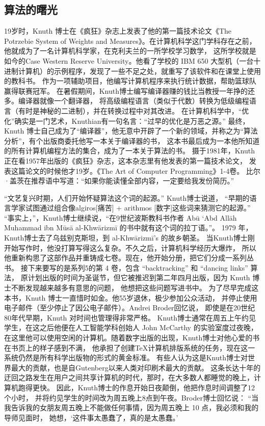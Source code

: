 \documentclass[12pt]{ctexart}
\begin{document}
\begin{multicols}{2}
\section{算法的曙光}

19岁时，Knuth 博士在《疯狂》杂志上发表了他的第一篇技术论文《The Potrzebie System of Weights and
Measures》。在计算机科学这门学科存在之前，他就成为了一名计算机科学家，在克利夫兰的一所学校学习数学，
这所学校就是如今的Case Western Reserve University。他看了学校的 IBM 650
大型机（一台十进制计算机）的示例程序，发现了一些不足之处，就重写了该软件和在课堂上使用的教科书。
作为一项辅助项目，他编写计算机程序来执行统计数据，帮助篮球队赢得联赛冠军。
在暑假期间，Knuth博士编写编译器赚的钱比当教授一年挣的还多。编译器就像一个翻译器，
将高级编程语言（类似于代数）转换为低级编程语言（有时是神秘的二进制），并在转换过程中对其改进。
在计算机科学中，“优化”确实是一门艺术，Knuthian有一句名言：“过早的优化是万恶之源。” 最终，Knuth
博士自己成为了“编译器”，他无意中开辟了一个新的领域，并称之为“算法分析”，有个出版商委托他写一本关于编译器的书，
这本书最后成为一本他所知道的所有计算机编程方法的集合，成为了一本关于算法的书。
摄于1981年，Knuth正在看1957年出版的《疯狂》杂志，这本杂志里有他发表的第一篇技术论文，
发表这篇论文的时候他才19岁。《The Art of Computer Programming》1-4卷。
比尔·盖茨在推荐语中写道：“如果你能读懂全部内容，一定要给我发份简历。”

“文艺复兴时期，人们开始怀疑算法这个词的起源。” Knuth博士说道，
“早期的语言学家试图通过组合像algiros[痛苦] + arithmos [数字]这些词来猜测它的起源。”
“事实上，”，Knuth博士继续说，“在9世纪波斯教科书作者 Abū ‘Abd Allāh Muhammad ibn Mūsā al-Khwārizmī 的书中就有这个词的拉丁语。”。
1979 年，Knuth博士去了乌兹别克斯坦，到 al-Khwārizmī’s 的故乡朝圣。
当Knuth博士刚开始写作时，他没打算写得这么复杂。不久之后，计算机科学经历大爆炸，
所以他重新构思了这部作品并重铸成七卷。现在，他开始分册，把它们分成一系列丛书。
接下来要写的是系列5的第 4 卷，包含 “backtracking”  和 “dancing links” 算法，
原计划出版的时间为圣诞节，但它被推迟到第二年四月出版，因为 Knuth 博士不断发现越来越多有意思的问题，
他想把这些问题写进书中。
为了尽早完成这本书，Knuth 博士一直惜时如金。他55岁退休，极少参加公众活动，
并停止使用电子邮件（至少停止了因公电子邮件）。Andrei Broder回忆说，
即使是在20世纪80年代早期，Knuth 对时间也管理得非常严格。
Knuth博士通常在周五上午约见学生，在这之后他便在人工智能学科创始人 John McCarthy 的实验室度过夜晚，
在这里他可以使用空闲的计算机。随着数字出版的出现，Knuth博士对他心爱的书在书页上的样子感到不满，
他承担了创建\TeX 计算机排版系统的任务，现在这一系统仍然是所有科学出版物的形式的黄金标准。
有些人认为这是Knuth博士对世界最大的贡献，也是自Gutenberg以来人类对印刷术最大的贡献。
这条长达十年的迂回之路发生在用户之间共享计算机的时代，那时，在大多数人都睡觉的晚上，计算机跑得更快。
因此，Knuth博士的作息开始日夜颠倒，他把作息时间调整了12个小时，
并将约见学生的时间改为周五晚上8点到午夜。Broder博士回忆说：
“当我告诉我的女朋友周五晚上不能做任何事情，因为周五晚上 10 点，我必须和我的导师见面时，
她想，‘这件事太愚蠢了，真的是太愚蠢。’


\end{multicols}
\end{document}
